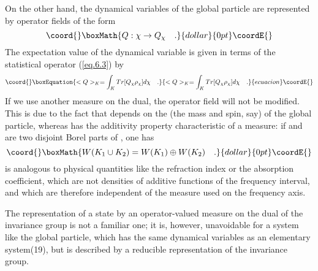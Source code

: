 \documentclass[a4paper,11pt]{article}
\begin{document}
On the other hand, the dynamical variables of the global particle are represented by 
operator fields of the form
$$\coord{}\boxMath{
   Q : \chi \rightarrow Q_{\chi}  \quad .
}{dollar}{0pt}\coordE{}$$
The expectation value of the dynamical variable \coordHE{} is given in terms of the statistical 
operator (\ref{eq.6.3}) by
\begin{equation}\coord{}\boxEquation{
 \label{eq.6.5}
    < Q >_K = \int_K Tr[Q_{\chi} \rho_{\chi} ] d\chi   \quad .
}{
 < Q >_K = \int_K Tr[Q_{\chi} \rho_{\chi} ] d\chi   \quad .
}{ecuacion}\coordE{}\end{equation}
If we use another measure on the dual, the operator field \coordHE{} will not be modified. This is due 
to the fact that \coordHE{} depends on the \myHighlight{$\chi$}\coordHE{} (the mass and spin, say) of the global 
particle, whereas \coordHE{} 
has the additivity property characteristic of a measure: if \coordHE{} and \coordHE{} are two disjoint 
Borel parts of \myHighlight{$\Gc$}\coordHE{}, one has
$$\coord{}\boxMath{
   W(K_1 \cup K_2) = W(K_1) \oplus W(K_2)  \quad .
}{dollar}{0pt}\coordE{}$$  \coordHE{} is analogous to physical quantities like the refraction index or the absorption 
coefficient, 
which are not densities of additive functions of the frequency interval, and which are 
therefore independent of the measure used on the frequency axis. 

The representation of a state by an operator-valued measure on the dual of the invariance group 
is not a familiar one; it is, however, unavoidable for a system like the global particle, which 
has the same dynamical variables as an elementary system(19), but is described by a reducible 
representation of the invariance group. 
\end{document}
